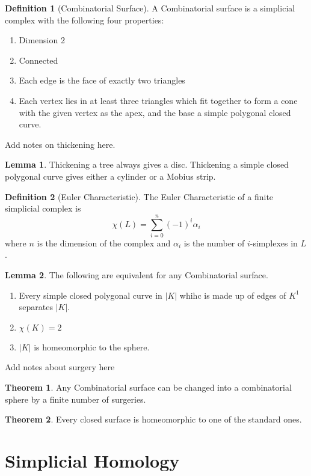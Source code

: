 \documentclass{article}
\theoremstyle{definition}
\newtheorem{definition}{Definition}[section]
\newtheorem{lemma}{Lemma}[section]
\newtheorem{theorem}{Theorem}[section]
\theoremstyle{remark}
\theoremstyle{remark}
\begin{document}
\begin{definition}[Combinatorial Surface]
    A Combinatorial surface is a simplicial complex with the following four properties:
    \begin{enumerate}
        \item Dimension 2
        \item Connected
        \item Each edge is the face of exactly two triangles
        \item Each vertex lies in at least three triangles which fit together to form a cone with the given vertex as the apex, and the base a simple polygonal closed curve.
    \end{enumerate}
\end{definition}

Add notes on thickening here.

\begin{lemma}
    Thickening a tree always gives a disc. Thickening a simple closed polygonal curve gives either a cylinder or a Mobius strip.
\end{lemma}

\begin{definition}[Euler Characteristic]
    The Euler Characteristic of a finite simplicial complex is 
    $$ \chi(L) = \sum_{i=0}^n (-1)^i \alpha_{i} $$
    where $n$ is the dimension of the complex and $\alpha_i$ is the number of $i$-simplexes in $L$.
\end{definition}

\begin{lemma}
    The following are equivalent for any Combinatorial surface.
    \begin{enumerate}
        \item Every simple closed polygonal curve in $|K|$ whihc is made up of edges of $K^1$ separates $|K|$.
        \item $\chi(K) = 2$
        \item $|K|$ is homeomorphic to the sphere.
    \end{enumerate}
\end{lemma}

Add notes about surgery here

\begin{theorem}
    Any Combinatorial surface can be changed into a combinatorial sphere by a finite number of surgeries.
\end{theorem}

\begin{theorem}
    Every closed surface is homeomorphic to one of the standard ones.
\end{theorem}

\section{Simplicial Homology}
\end{document}

